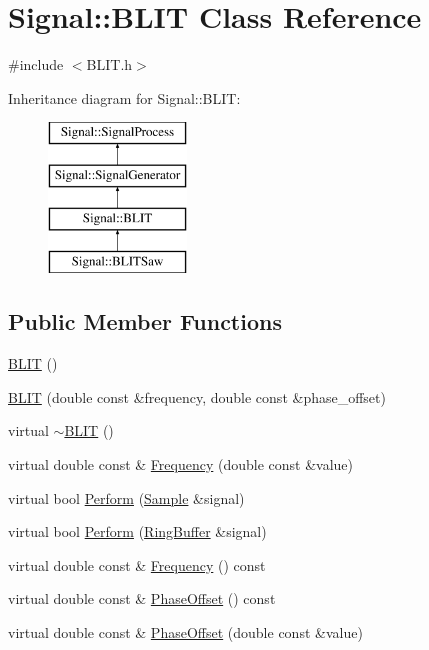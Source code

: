 \hypertarget{class_signal_1_1_b_l_i_t}{\section{Signal\+:\+:B\+L\+I\+T Class Reference}
\label{class_signal_1_1_b_l_i_t}
}


{\ttfamily \#include $<$B\+L\+I\+T.\+h$>$}

Inheritance diagram for Signal\+:\+:B\+L\+I\+T\+:\begin{figure}[H]
\begin{center}
\leavevmode
\includegraphics[height=4.000000cm]{class_signal_1_1_b_l_i_t}
\end{center}
\end{figure}
\subsection*{Public Member Functions}
\begin{DoxyCompactItemize}
\item 
\hyperlink{class_signal_1_1_b_l_i_t_a15ce7fdad59925c403e2e789bb7348e2}{B\+L\+I\+T} ()
\item 
\hyperlink{class_signal_1_1_b_l_i_t_a11752682082d258f8ef4f516d3d936f7}{B\+L\+I\+T} (double const \&frequency, double const \&phase\+\_\+offset)
\item 
virtual \hyperlink{class_signal_1_1_b_l_i_t_a408ab9b532d43f25d8531dffc741cd36}{$\sim$\+B\+L\+I\+T} ()
\item 
virtual double const \& \hyperlink{class_signal_1_1_b_l_i_t_a911a6d5d3e218613b4740d4321f7207e}{Frequency} (double const \&value)
\item 
virtual bool \hyperlink{class_signal_1_1_b_l_i_t_abf70cd38b2b848800b34de8baaf366b3}{Perform} (\hyperlink{class_signal_1_1_sample}{Sample} \&signal)
\item 
virtual bool \hyperlink{class_signal_1_1_b_l_i_t_a3b18e1f25f0900de4cf709cfc849b4c7}{Perform} (\hyperlink{class_signal_1_1_ring_buffer}{Ring\+Buffer} \&signal)
\item 
virtual double const \& \hyperlink{class_signal_1_1_signal_generator_a96af42ee68f94e9b04d034fd68b73ecd}{Frequency} () const 
\item 
virtual double const \& \hyperlink{class_signal_1_1_signal_generator_ac2538ec946f001e394d2416fda698d1c}{Phase\+Offset} () const 
\item 
virtual double const \& \hyperlink{class_signal_1_1_signal_generator_ac6a103ff72beaa338f6d18c812522d78}{Phase\+Offset} (double const \&value)
\end{DoxyCompactItemize}
